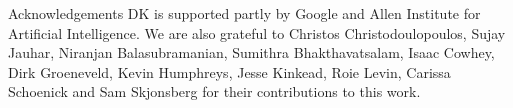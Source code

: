 \documentclass[final]{beamer}
\newlength{\onecolwid}
\begin{document}
\begin{frame}[t]
\begin{columns}[t]
\begin{column}{\onecolwid}
%
%







\vspace{-2	cm}

\begin{block}{Acknowledgements}
	\footnotesize{
	DK is supported partly by Google and Allen Institute for Artificial Intelligence.  
	We are also grateful to Christos Christodoulopoulos, Sujay Jauhar, Niranjan Balasubramanian, Sumithra Bhakthavatsalam, Isaac Cowhey, Dirk
	Groeneveld, Kevin Humphreys, Jesse Kinkead, Roie Levin,
	Carissa Schoenick and Sam Skjonsberg for their contributions to this work. 
	}
\end{block}

\end{column} %

\end{columns} %

\end{frame} %
\end{document}
